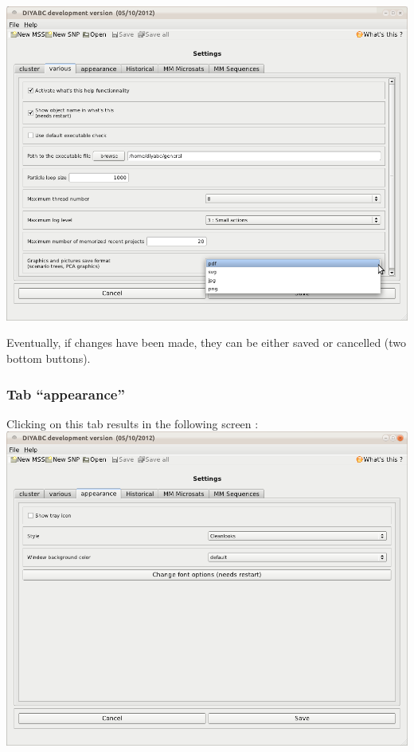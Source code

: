 \begin{enumerate}
\includegraphics[scale=0.33]{gui_pictures/Capture-DIYABC-97.png} \\
   
\end{enumerate}

Eventually, if changes have been made, they can be either saved or cancelled (two bottom buttons).

\subsubsection{Tab \textsf{``appearance''}}

Clicking on this tab results in the following screen :\\

\includegraphics[scale=0.33]{gui_pictures/Capture-DIYABC-98.png} \\

